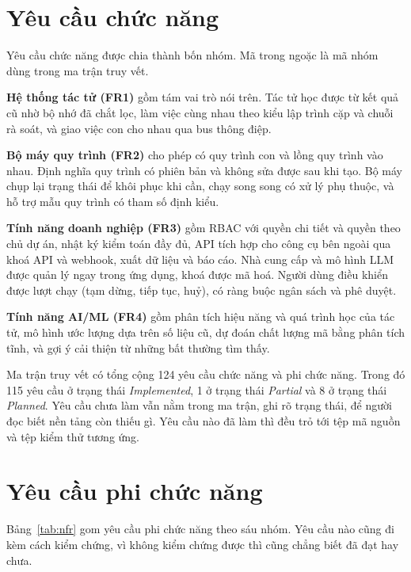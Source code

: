 \section{Yêu cầu chức năng}

Yêu cầu chức năng được chia thành bốn nhóm. Mã trong ngoặc là mã nhóm dùng trong ma trận truy vết.

\textbf{Hệ thống tác tử (FR1)} gồm tám vai trò nói trên. Tác tử học được từ kết quả cũ nhờ bộ nhớ đã chắt lọc, làm việc cùng nhau theo kiểu lập trình cặp và chuỗi rà soát, và giao việc con cho nhau qua bus thông điệp.

\textbf{Bộ máy quy trình (FR2)} cho phép có quy trình con và lồng quy trình vào nhau. Định nghĩa quy trình có phiên bản và không sửa được sau khi tạo. Bộ máy chụp lại trạng thái để khôi phục khi cần, chạy song song có xử lý phụ thuộc, và hỗ trợ mẫu quy trình có tham số định kiểu.

\textbf{Tính năng doanh nghiệp (FR3)} gồm RBAC với quyền chi tiết và quyền theo chủ dự án, nhật ký kiểm toán đầy đủ, API tích hợp cho công cụ bên ngoài qua khoá API và webhook, xuất dữ liệu và báo cáo. Nhà cung cấp và mô hình LLM được quản lý ngay trong ứng dụng, khoá được mã hoá. Người dùng điều khiển được lượt chạy (tạm dừng, tiếp tục, huỷ), có ràng buộc ngân sách và phê duyệt.

\textbf{Tính năng AI/ML (FR4)} gồm phân tích hiệu năng và quá trình học của tác tử, mô hình ước lượng dựa trên số liệu cũ, dự đoán chất lượng mã bằng phân tích tĩnh, và gợi ý cải thiện từ những bất thường tìm thấy.

Ma trận truy vết có tổng cộng 124 yêu cầu chức năng và phi chức năng. Trong đó 115 yêu cầu ở trạng thái \textit{Implemented}, 1 ở trạng thái \textit{Partial} và 8 ở trạng thái \textit{Planned}. Yêu cầu chưa làm vẫn nằm trong ma trận, ghi rõ trạng thái, để người đọc biết nền tảng còn thiếu gì. Yêu cầu nào đã làm thì đều trỏ tới tệp mã nguồn và tệp kiểm thử tương ứng.

\section{Yêu cầu phi chức năng}

Bảng~\ref{tab:nfr} gom yêu cầu phi chức năng theo sáu nhóm. Yêu cầu nào cũng đi kèm cách kiểm chứng, vì không kiểm chứng được thì cũng chẳng biết đã đạt hay chưa.

